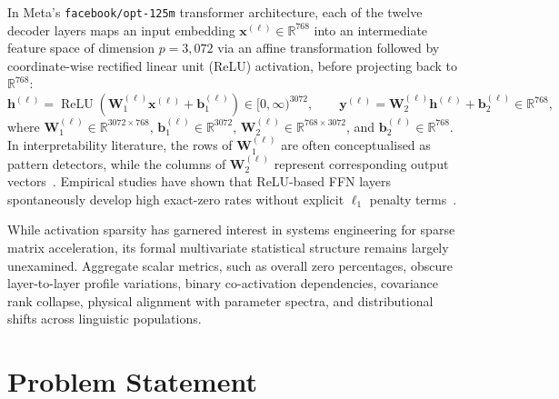 \documentclass[12pt, a4paper, oneside]{report}
\theoremstyle{definition}
\newcommand{\vect}[1]{\mathbf{#1}}
\newcommand{\mat}[1]{\mathbf{#1}}
\newcommand{\R}{\mathbb{R}}
\begin{document}
In Meta's \texttt{facebook/opt-125m} transformer architecture, each of the twelve decoder layers maps an input embedding $\vect{x}^{(\ell)} \in \R^{768}$ into an intermediate feature space of dimension $p = 3{,}072$ via an affine transformation followed by coordinate-wise rectified linear unit (ReLU) activation, before projecting back to $\R^{768}$:
\begin{equation}
    \vect{h}^{(\ell)} = \operatorname{ReLU}\!\left(\mat{W}_1^{(\ell)} \vect{x}^{(\ell)} + \vect{b}_1^{(\ell)}\right) \in [0, \infty)^{3072},
    \qquad
    \vect{y}^{(\ell)} = \mat{W}_2^{(\ell)} \vect{h}^{(\ell)} + \vect{b}_2^{(\ell)} \in \R^{768},
    \label{eq:ffn_mapping}
\end{equation}
where $\mat{W}_1^{(\ell)} \in \R^{3072 \times 768}$, $\vect{b}_1^{(\ell)} \in \R^{3072}$, $\mat{W}_2^{(\ell)} \in \R^{768 \times 3072}$, and $\vect{b}_2^{(\ell)} \in \R^{768}$. In interpretability literature, the rows of $\mat{W}_1^{(\ell)}$ are often conceptualised as pattern detectors, while the columns of $\mat{W}_2^{(\ell)}$ represent corresponding output vectors~\cite{geva2021transformer}. Empirical studies have shown that ReLU-based FFN layers spontaneously develop high exact-zero rates without explicit $\ell_1$ penalty terms~\cite{li2023emergence}.

While activation sparsity has garnered interest in systems engineering for sparse matrix acceleration, its formal multivariate statistical structure remains largely unexamined. Aggregate scalar metrics, such as overall zero percentages, obscure layer-to-layer profile variations, binary co-activation dependencies, covariance rank collapse, physical alignment with parameter spectra, and distributional shifts across linguistic populations.

\section{Problem Statement}
\end{document}
